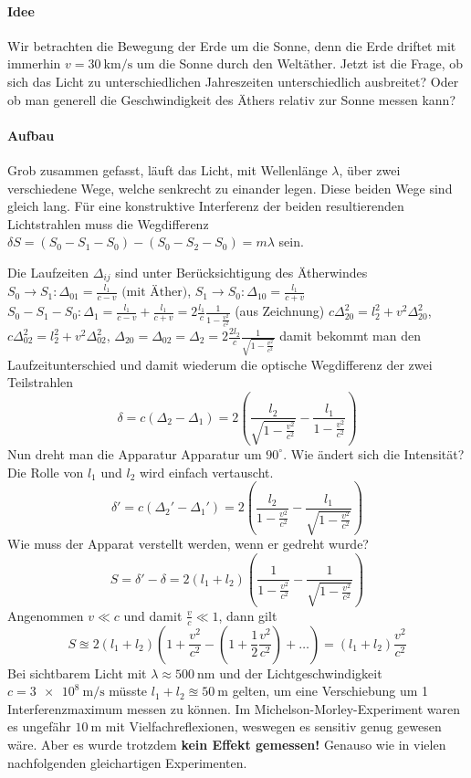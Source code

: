 \paragraph{Idee} Wir betrachten die Bewegung der Erde um die Sonne, denn die Erde driftet mit immerhin $v = \SI{30}{\km\per\s}$ um die Sonne durch den Weltäther. Jetzt ist die Frage, ob sich das Licht zu unterschiedlichen Jahreszeiten unterschiedlich ausbreitet? Oder ob man generell die Geschwindigkeit des Äthers relativ zur Sonne messen kann?

\paragraph{Aufbau}
Grob zusammen gefasst, läuft das Licht, mit Wellenlänge $\lambda$, über zwei verschiedene Wege, welche senkrecht zu einander legen. Diese beiden Wege sind gleich lang. Für eine konstruktive Interferenz der beiden resultierenden Lichtstrahlen muss die Wegdifferenz $\delta S = (S_0 - S_1 - S_0) - (S_0 - S_2 - S_0) = m \lambda$ sein.

Die Laufzeiten $\Delta_{ij}$ sind unter Berücksichtigung des Ätherwindes $S_0 \to S_1: \Delta_{01} = \frac{l_1}{c - v} \text{~(mit Äther)}$, $S_1 \to S_0: \Delta_{10} = \frac{l_1}{c + v}$ \conseq $S_0 - S_1 - S_0: \Delta_1 = \frac{l_1}{c-v} + \frac{l_1}{c+v} = 2 \frac{l_1}{c} \frac{1}{1 - \frac{v^2}{c^2}}$ (aus Zeichnung) $c\Delta_{20}^2 = l_2^2 + v^2 \Delta_{20}^2$, $c\Delta_{02}^2 = l_2^2 + v^2 \Delta_{02}^2$, $\Delta_{20} = \Delta_{02} = \Delta_{2} = 2 \frac{2l_2}{c} \frac{1}{\sqrt{1 - \frac{v^2}{c^2}}}$ damit bekommt man den Laufzeitunterschied und damit wiederum die optische Wegdifferenz der zwei Teilstrahlen
$$\delta = c (\Delta_2 - \Delta_1) = 2 \left(\frac{l_2}{\sqrt{1 - \frac{v^2}{c^2}}} - \frac{l_1}{1 - \frac{v^2}{c^2}}\right)$$ 
Nun dreht man die Apparatur Apparatur um $90^\circ$. Wie ändert sich die Intensität? Die Rolle von $l_1$ und $l_2$ wird einfach vertauscht.
$$\delta' = c (\Delta_2' - \Delta_1') = 2 \left(\frac{l_2}{1 - \frac{v^2}{c^2}} - \frac{l_1}{\sqrt{1 - \frac{v^2}{c^2}}}\right)$$
Wie muss der Apparat verstellt werden, wenn er gedreht wurde?
$$S = \delta' - \delta = 2(l_1 + l_2) \left(\frac{1}{1-\frac{v^2}{c^2}} - \frac{1}{\sqrt{1 - \frac{v^2}{c^2}}}\right)$$
Angenommen  $v \ll c$ und damit $\frac{v}{c} \ll 1$, dann gilt
$$S \approxeq 2 (l_1 + l_2) \left(1 + \frac{v^2}{c^2} - (1 + \frac{1}{2} \frac{v^2}{c^2}) + \dots\right) = (l_1 + l_2) \frac{v^2}{c^2}$$
Bei sichtbarem Licht mit $\lambda \approx \SI{500}{\nm}$ und der Lichtgeschwindigkeit $c = \SI{3e8}{\meter\per\second}$ müsste $l_1 + l_2 \approxeq \SI{50}{\m}$ gelten, um eine Verschiebung um 1 Interferenzmaximum messen zu können.
Im Michelson-Morley-Experiment waren es ungefähr $\SI{10}{\m}$ mit Vielfachreflexionen, weswegen es sensitiv genug gewesen wäre. Aber es wurde trotzdem \textbf{kein Effekt gemessen!} Genauso wie in vielen nachfolgenden gleichartigen Experimenten.

